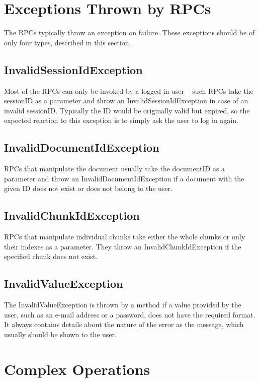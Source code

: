 \section{Exceptions Thrown by RPCs}

The RPCs typically throw an exception on failure. These exceptions should be of only four types, described in this section.

\subsection{InvalidSessionIdException}

Most of the RPCs can only be invoked by a logged in user -- such RPCs take the sessionID as a parameter and throw an InvalidSessionIdException in case of an invalid sessionID. Typically the ID would be originally valid but expired, so the expected reaction to this exception is to simply ask the user to log in again.

\subsection{InvalidDocumentIdException}

RPCs that manipulate the document usually take the documentID as a parameter and throw an InvalidDocumentIdException if a document with the given ID does not exist or does not belong to the user.

\subsection{InvalidChunkIdException}

RPCs that manipulate individual chunks take either the whole chunks or only their indexes as a parameter. They throw an InvalidChunkIdException if the specified chunk does not exist.

\subsection{InvalidValueException}

The InvalidValueException is thrown by a method if a value provided by the user, such as an e-mail address or a password, does not have the required format. It always contains details about the nature of the error as the message, which usually should be shown to the user.

\section{Complex Operations}

